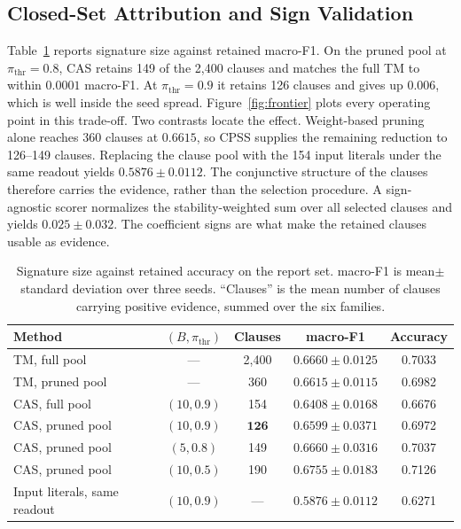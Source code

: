 \documentclass[conference]{IEEEtran}
\begin{document}
\subsection{Closed-Set Attribution and Sign Validation}
\label{sec:taska}\label{sec:validation}
Table~\ref{tab:headline} reports signature size against retained
macro-F1. On the pruned pool at $\pi_{\mathrm{thr}}=0.8$, CAS retains
149 of the 2,400 clauses and matches the full TM to within $0.0001$
macro-F1. At $\pi_{\mathrm{thr}}=0.9$ it retains 126 clauses and gives
up $0.006$, which is well inside the seed spread.
Figure~\ref{fig:frontier} plots every operating point in this
trade-off. Two contrasts locate the effect. Weight-based pruning alone
reaches 360 clauses at $0.6615$, so CPSS supplies the remaining
reduction to 126--149 clauses. Replacing the clause pool with the 154
input literals under the same readout yields $0.5876\pm0.0112$. The
conjunctive structure of the clauses therefore carries the evidence,
rather than the selection procedure. A sign-agnostic scorer normalizes
the stability-weighted sum over all selected clauses and yields
$0.025\pm0.032$. The coefficient signs are what make the retained
clauses usable as evidence.

\begin{table}[t]
\centering
\caption{Signature size against retained accuracy on the report set.
macro-F1 is mean$\pm$standard deviation over three seeds. ``Clauses''
is the mean number of clauses carrying positive evidence, summed over
the six families.}
\label{tab:headline}
\footnotesize
\setlength{\tabcolsep}{3pt}
\begin{tabular}{@{}lcccc@{}}
\toprule
Method & $(B,\pi_{\mathrm{thr}})$ & Clauses & macro-F1 & Accuracy \\
\midrule
TM, full pool & --- & 2{,}400 & $0.6660\pm0.0125$ & 0.7033 \\
TM, pruned pool & --- & 360 & $0.6615\pm0.0115$ & 0.6982 \\
CAS, full pool & $(10,0.9)$ & 154 & $0.6408\pm0.0168$ & 0.6676 \\
CAS, pruned pool & $(10,0.9)$ & $\mathbf{126}$ & $0.6599\pm0.0371$ & 0.6972 \\
CAS, pruned pool & $(5,0.8)$ & 149 & $\mathbf{0.6660\pm0.0316}$ & 0.7037 \\
CAS, pruned pool & $(10,0.5)$ & 190 & $0.6755\pm0.0183$ & 0.7126 \\
\midrule
Input literals, same readout & $(10,0.9)$ & --- & $0.5876\pm0.0112$ & 0.6271 \\
\bottomrule
\end{tabular}
\end{table}
\end{document}
